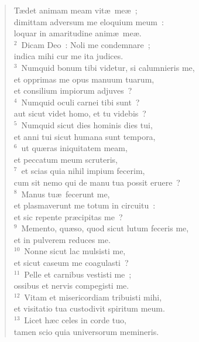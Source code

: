 \begin{flushleft}\begin{verse}\vspace{-19pt}\hspace{6pt}T\ae det animam meam vit\ae\ me\ae~;\\\hspace{6pt} dimittam adversum me eloquium meum~:\\ loquar in amaritudine anim\ae\ me\ae .\\
${}^{2}$~Dicam Deo~: Noli me condemnare~;\\ indica mihi cur me ita judices.\\
${}^{3}$~Numquid bonum tibi videtur, si calumnieris me,\\ et opprimas me opus manuum tuarum,\\ et consilium impiorum adjuves~?\\
${}^{4}$~Numquid oculi carnei tibi sunt~?\\ aut sicut videt homo, et tu videbis~?\\
${}^{5}$~Numquid sicut dies hominis dies tui,\\ et anni tui sicut humana sunt tempora,\\
${}^{6}$~ut qu\ae ras iniquitatem meam,\\ et peccatum meum scruteris,\\
${}^{7}$~et scias quia nihil impium fecerim,\\ cum sit nemo qui de manu tua possit eruere~?\\
${}^{8}$~Manus tu\ae\ fecerunt me,\\ et plasmaverunt me totum in circuitu~:\\ et sic repente pr\ae cipitas me~?\\
${}^{9}$~Memento, qu\ae so, quod sicut lutum feceris me,\\ et in pulverem reduces me.\\
${}^{10}$~Nonne sicut lac mulsisti me,\\ et sicut caseum me coagulasti~?\\
${}^{11}$~Pelle et carnibus vestisti me~;\\ ossibus et nervis compegisti me.\\
${}^{12}$~Vitam et misericordiam tribuisti mihi,\\ et visitatio tua custodivit spiritum meum.\\
${}^{13}$~Licet h\ae c celes in corde tuo,\\ tamen scio quia universorum memineris.\\

\end{verse}
\end{flushleft}
